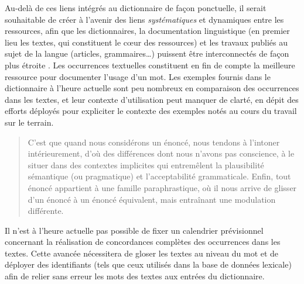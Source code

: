 Au-delà de ces liens intégrés au dictionnaire de façon ponctuelle, il serait souhaitable de créer à l'avenir des liens \emph{systématiques} et dynamiques entre les ressources, afin que les dictionnaires, la documentation linguistique (en premier lieu les textes, qui constituent le cœur des ressources) et les travaux publiés au sujet de la langue (articles, grammaires…) puissent être interconnectés de façon plus étroite \parencite{maxwell2012}. Les occurrences textuelles constituent en fin de compte la meilleure ressource pour documenter l'usage d'un mot. Les exemples fournis dans le dictionnaire à l'heure actuelle sont peu nombreux en comparaison des occurrences dans les textes, et leur contexte d'utilisation peut manquer de clarté, en dépit des efforts déployés pour expliciter le contexte des exemples notés au cours du travail sur le terrain.

\begin{quotation}
    C'est que quand nous considérons un énoncé, nous tendons à l'intoner intérieurement, d'où des différences dont nous n'avons pas conscience, à le situer dans des contextes implicites qui entremêlent la plausibilité sémantique (ou pragmatique) et l'acceptabilité grammaticale. Enfin, tout énoncé appartient à une famille paraphrastique, où il nous arrive de glisser d'un énoncé à un énoncé équivalent, mais entraînant une modulation différente. \parencite[17]{culioli1990}
\end{quotation}

Il n'est à l'heure actuelle pas possible de fixer un calendrier prévisionnel concernant la réalisation de concordances complètes des occurrences dans les textes. Cette avancée nécessitera de gloser les textes au niveau du mot et de déployer des identifiants (tels que ceux utilisés dans la base de données lexicale) afin de relier sans erreur les mots des textes aux entrées du dictionnaire.







